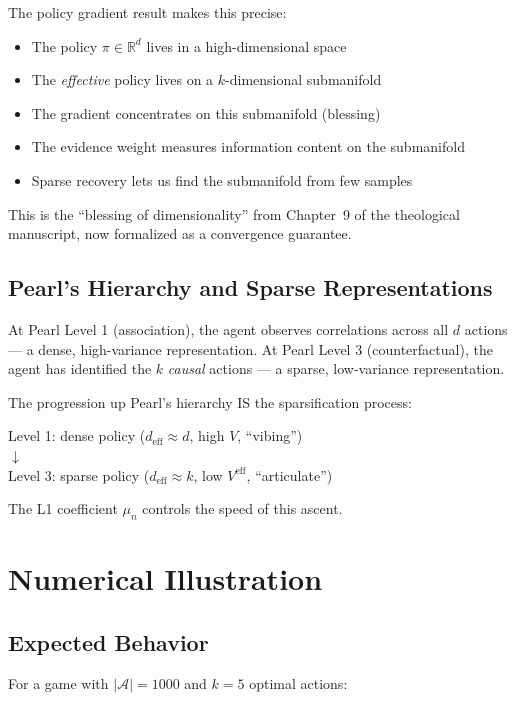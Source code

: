 \documentclass[11pt,a4paper]{article}
\newcommand{\R}{\mathbb{R}}
\begin{document}
The policy gradient result makes this precise:
\begin{itemize}
  \item The policy $\pi \in \R^d$ lives in a high-dimensional space
  \item The \emph{effective} policy lives on a $k$-dimensional submanifold
  \item The gradient concentrates on this submanifold (blessing)
  \item The evidence weight measures information content on the submanifold
  \item Sparse recovery lets us find the submanifold from few samples
\end{itemize}

This is the ``blessing of dimensionality'' from Chapter~9 of the
theological manuscript, now formalized as a convergence guarantee.

\subsection{Pearl's Hierarchy and Sparse Representations}

At Pearl Level 1 (association), the agent observes correlations across
all $d$ actions --- a dense, high-variance representation. At Pearl
Level 3 (counterfactual), the agent has identified the $k$ \emph{causal}
actions --- a sparse, low-variance representation.

The progression up Pearl's hierarchy IS the sparsification process:
\begin{center}
Level 1: dense policy ($d_{\text{eff}} \approx d$, high $V$, ``vibing'') \\
$\downarrow$  \\
Level 3: sparse policy ($d_{\text{eff}} \approx k$, low $V^{\text{eff}}$, ``articulate'')
\end{center}

The L1 coefficient $\mu_n$ controls the speed of this ascent.


\section{Numerical Illustration}

\subsection{Expected Behavior}

For a game with $|\mathcal{A}| = 1000$ and $k = 5$ optimal actions:
\end{document}
